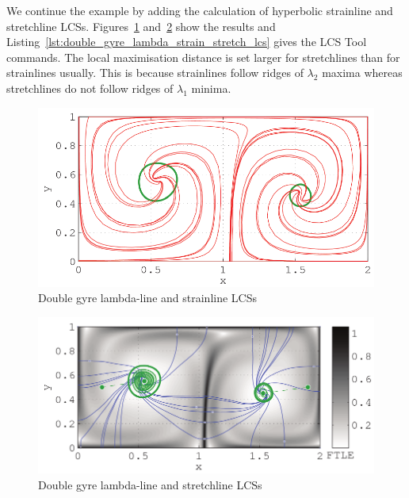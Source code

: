 \documentclass{article}
\begin{document}
We continue the example by adding the calculation of hyperbolic strainline and stretchline LCSs. Figures~\ref{fig:double_gyre_lambda_strain_lcs} and~\ref{fig:double_gyre_lambda_stretch_lcs} show the results and Listing~\ref{lst:double_gyre_lambda_strain_stretch_lcs} gives the LCS Tool commands. The local maximisation distance is set larger for stretchlines than for strainlines usually. This is because strainlines follow ridges of $\lambda_2$ maxima whereas stretchlines do not follow ridges of $\lambda_1$ minima.

\begin{figure}
  \centering
  \includegraphics[width=\textwidth]{graphics/double_gyre/lambda_strain_lcs}
  \caption{Double gyre lambda-line and strainline LCSs}
  \label{fig:double_gyre_lambda_strain_lcs}
\end{figure}

\begin{figure}
  \centering
  \includegraphics[width=\textwidth]{graphics/double_gyre/lambda_stretch_lcs}
  \caption{Double gyre lambda-line and stretchline LCSs}
  \label{fig:double_gyre_lambda_stretch_lcs}
\end{figure}


\end{document}
